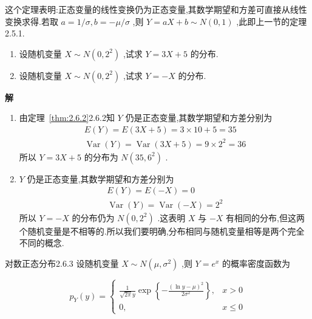 这个定理表明:正态变量的线性变换仍为正态变量,其数学期望和方差可直接从线性变换求得.若取 $ a=1 / \sigma, b=-\mu / \sigma $ ,则 $ Y=a X+b \sim N(0,1) $ ,此即上一节的定理2.5.1.

\begin{example}\label{exam:2.6.2}
	\begin{enumerate}
		\item 设随机变量 $ X \sim N\left(0,2^{2}\right) $ ,试求 $ Y=3X+5 $ 的分布.
		\item 设随机变量 $ X \sim N\left(0,2^{2}\right) $ ,试求 $ Y=-X $ 的分布.
	\end{enumerate}
	
	\textbf{解}
	
	\begin{enumerate}
		\item 由定理~\ref{thm:2.6.2}2.6.2知 $ Y $ 仍是正态变量,其数学期望和方差分别为
		\[
		\begin{array}{l}
		{E(Y)=E(3 X+5)=3 \times 10+5=35} \\
		{\operatorname{Var}(Y)=\operatorname{Var}(3 X+5)=9 \times 2^{2}=36}
		\end{array}
		\]
		所以 $ Y=3X+5 $ 的分布为 $ N\left(35,6^{2}\right) $ .
		\item $ Y $ 仍是正态变量,其数学期望和方差分别为
		\[
		\begin{array}{l}
		{E(Y)=E(-X)=0} \\ {\operatorname{Var}(Y)=\operatorname{Var}(-X)=2^{2}}
		\end{array}
		\]
		所以 $ Y=-X $ 的分布仍为 $ N\left(0,2^{2}\right) $ .这表明 $ X $ 与 $ -X $ 有相同的分布,但这两个随机变量是不相等的.所以我们要明确,分布相同与随机变量相等是两个完全不同的概念.
	\end{enumerate}
\end{example}

\begin{theorem}{对数正态分布}{2.6.3}
	设随机变量 $ X \sim N\left(\mu, \sigma^{2}\right) $ ,则 $ Y=e^{x} $ 的概率密度函数为
	
	\begin{equation}
	p_{Y}(y)=\left\{\begin{array}{ll}
	{\frac{1}{\sqrt{2 \pi} y} \exp \left\{-\frac{(\ln y-\mu)^{2}}{2 \sigma^{2}}\right\},} & {x>0} \\ 
	{0,} & {x \leqslant 0}
	\end{array}\right. \label{eq:2.6.2}
	\end{equation}
\end{theorem}

